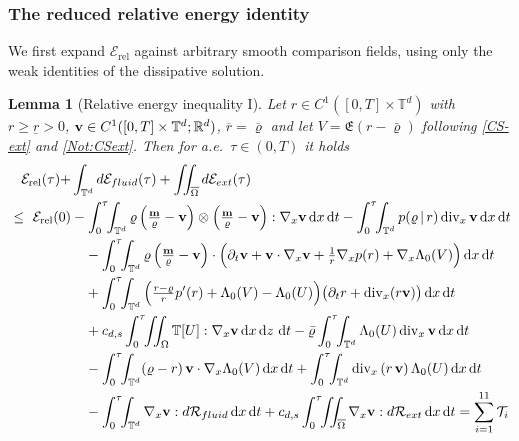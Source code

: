 \documentclass[12pt,a4paper,twoside]{article}
\newcommand{\Ov}[1]{\overline{#1}}
\newcommand{\vr}{\varrho}
\newcommand{\vv}{\vc{v}}
\newcommand{\vc}[1]{{\bf #1}}
\newcommand{\dx}{{\,\rm d} {x}}
\newcommand{\dt}{{\,\rm d} t }
\newcommand{\lr}[1]{\left( #1 \right)}
\newcommand{\Erel}{\mathcal{E}_{\mathrm{rel}}}
\newtheorem{lemma}[thm]{Lemma}
\numberwithin{equation}{section}%
\newcommand{\T}{\mathbb{T}}
\newcommand{\vm}{\vc{m}}
\newcommand{\dz}{{\rm d} z}
\newcommand{\Gradx}{\nabla_x}
\newcommand{\Divx}{\operatorname{div}_x}
\newcommand{\Lambdaz}{\Lambda_0}
\begin{document}
	
	\subsubsection{The reduced relative energy identity}
	
	We first expand $\Erel$ against arbitrary smooth comparison fields, using only the weak identities of the dissipative solution. %
	
	\begin{lemma}[Relative energy inequality I]\label{lem:generic}
		Let $r\in C^1([0,T]\times\mathbb T^d)$ with $r\ge\underline r>0$, $\vv\in C^1([0,T]\times\mathbb T^d;\mathbb R^d)$, $\Ov{r}=\Ov{\vr}$ and let $V=\mathfrak{E}(r-\bar\vr)$ following \eqref{CS-ext} and \eqref{Not:CSext}. Then for a.e.\ $\tau\in(0,T)$ it holds
	\begin{equation}\label{REI1}
		\begin{aligned}
			\Erel(\tau)+&\int_{\mathbb T^d}d\mathcal E_{fluid}(\tau)+\iint_{\overline\Omega}d\mathcal E_{ext}(\tau)
			\\
			\ \le\ \Erel(0)&-\int_0^\tau\!\!\int_{\mathbb T^d}\vr \lr{\tfrac{\vm}{\vr}-\vv}\otimes\lr{\tfrac{\vm}{\vr}-\vv}:\Gradx\vv \dx\dt 
			-\int_0^\tau\!\!\int_{\mathbb T^d}p(\vr\,|\,r)\Divx\vv\dx \dt \\
			&\quad-\int_0^\tau\!\!\int_{\mathbb T^d}\vr\lr{\tfrac{\vm}{\vr}-\vv} \cdot\Big(\partial_t\vv+\vv\cdot\Gradx\vv+\tfrac1r\Gradx p(r)+\Gradx\Lambdaz(V)\Big) \dx \dt \\
			&\quad+\int_0^\tau\!\!\int_{\mathbb T^d}\Big(\tfrac{r-\vr}{r}p'(r)+\Lambdaz(V)-\Lambdaz(U)\Big)\big(\partial_t r+\Divx(r\vv)\big) \dx \dt \\
			&\quad+c_{d,s}\int_0^\tau\!\!\iint_\Omega\T[U]:\Gradx\vv \dx\, \dz\,  \dt
			-\bar\vr\int_0^\tau\!\!\int_{\mathbb T^d}\Lambdaz(U)\Divx\vv \dx \dt \\
			&\quad-\int_0^\tau\!\!\int_{\mathbb T^d}(\vr-r)\,\vv\cdot\Gradx\Lambdaz(V) \dx \dt
			+\int_0^\tau\!\!\int_{\mathbb T^d} \Divx\lr{r\,\vv} \Lambdaz(U) \dx \dt \\
			&\quad-\int_0^\tau\!\!\int_{\mathbb T^d}\Gradx\vv:d\mathcal R_{fluid} \dx \dt 
			+c_{d,s}\int_0^\tau\!\!\iint_{\overline\Omega}\Gradx\vv:d\mathcal R_{ext} \dx \dt = \sum_{i=1}^{11}\mathcal{T}_i
		\end{aligned}
	\end{equation}
	\end{lemma}
	
\end{document}
